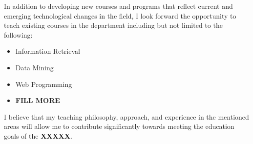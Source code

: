 \documentclass[12pt]{letter} %
\begin{document}
In addition to developing new courses and programs that reflect current and emerging technological changes in the field, I look forward the opportunity to teach existing courses in the department including but not limited to the following:

\begin{itemize}
\item Information Retrieval
\item Data Mining
\item Web Programming
\item \textbf{FILL MORE}
\end{itemize}

I believe that my teaching philosophy, approach, and experience in the mentioned areas will allow me to contribute significantly towards meeting the education goals of the \textbf{XXXXX}.
\end{document}
